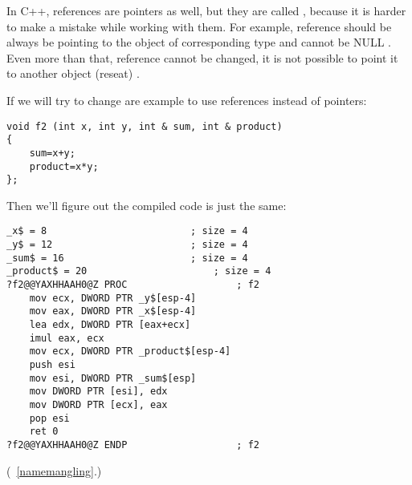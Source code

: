 {In C++, references are pointers as well, but they are called , because it is harder to make a mistake while
working with them}\cite[8.3.2]{CPP11}.
{For example, reference should be always be pointing to the object of corresponding type and cannot be NULL}
\cite[8.6]{ParashiftCPPFAQ}.
{Even more than that, reference cannot be changed, it is not possible to point it to another object (reseat)}
\cite[8.5]{ParashiftCPPFAQ}.

{If we will try to change are example to use references instead of pointers:}

\begin{lstlisting}
void f2 (int x, int y, int & sum, int & product)
{
	sum=x+y;
	product=x*y;
};
\end{lstlisting}

{Then we'll figure out the compiled code is just the same:}

\begin{lstlisting}[caption=\Optimizing MSVC 2010]
_x$ = 8							; size = 4
_y$ = 12						; size = 4
_sum$ = 16						; size = 4
_product$ = 20						; size = 4
?f2@@YAXHHAAH0@Z PROC					; f2
	mov	ecx, DWORD PTR _y$[esp-4]
	mov	eax, DWORD PTR _x$[esp-4]
	lea	edx, DWORD PTR [eax+ecx]
	imul eax, ecx
	mov ecx, DWORD PTR _product$[esp-4]
	push esi
	mov	esi, DWORD PTR _sum$[esp]
	mov	DWORD PTR [esi], edx
	mov	DWORD PTR [ecx], eax
	pop	esi
	ret	0
?f2@@YAXHHAAH0@Z ENDP					; f2
\end{lstlisting}

(~\ref{namemangling}.)

